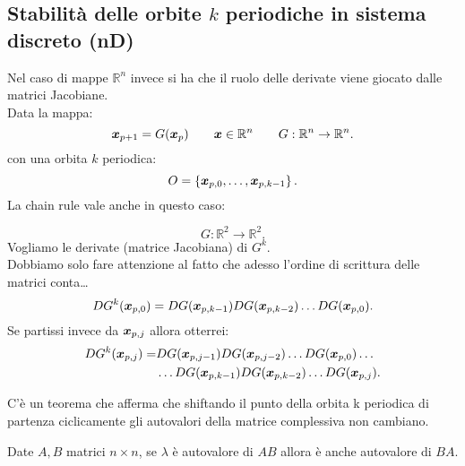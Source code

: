 \subsection{Stabilità delle orbite $k$ periodiche in sistema discreto (nD)}%
Nel caso di mappe $\mathbb{R}^n$ invece si ha che il ruolo delle derivate viene giocato dalle matrici Jacobiane.\\
Data la mappa:
\[
    \boldsymbol{x}_{p+1}=G(\boldsymbol{x}_{p}) \qquad  \boldsymbol{x}\in \mathbb{R}^n \qquad  G:\mathbb{R}^n\to \mathbb{R}^n
.\] 
con una orbita $k$ periodica:
\[
    O = \left\{\boldsymbol{x}_{p, 0}, \ldots, \boldsymbol{x}_{p, k-1}\right\}
.\] 
La chain rule vale anche in questo caso:
\begin{exmp}
    \[
        G:\mathbb{R}^2\to \mathbb{R}^2
    .\] 
    Vogliamo le derivate (matrice Jacobiana) di $G^k$.\\
    Dobbiamo solo fare attenzione al fatto che adesso l'ordine di scrittura delle matrici conta\ldots
    \[
	DG^k(\boldsymbol{x}_{p, 0}) = DG(\boldsymbol{x}_{p, k-1}) DG(\boldsymbol{x}_{p, k-2})\ldots DG(\boldsymbol{x}_{p, 0}) 
    .\] 
    Se partissi invece da $\boldsymbol{x}_{p, j}$ allora otterrei:
    \[\begin{aligned}
	DG^{k}(\boldsymbol{x}_{p, j}) =& DG(\boldsymbol{x}_{p, j-1}) DG(\boldsymbol{x}_{p, j-2})\ldots DG(\boldsymbol{x}_{p, 0}) \ldots \\
			      & \ldots DG(\boldsymbol{x}_{p, k-1}) DG(\boldsymbol{x}_{p, k-2}) \ldots DG(\boldsymbol{x}_{p, j}) 
    .\end{aligned}\]
\end{exmp}
\noindent
C'è un teorema che afferma che shiftando il punto della orbita k periodica di partenza ciclicamente gli autovalori della matrice complessiva non cambiano.
\begin{thm}
    Date $A, B$ matrici $n\times n$, se $\lambda$ è autovalore di $AB$ allora è anche autovalore di $BA$. 
\end{thm}
